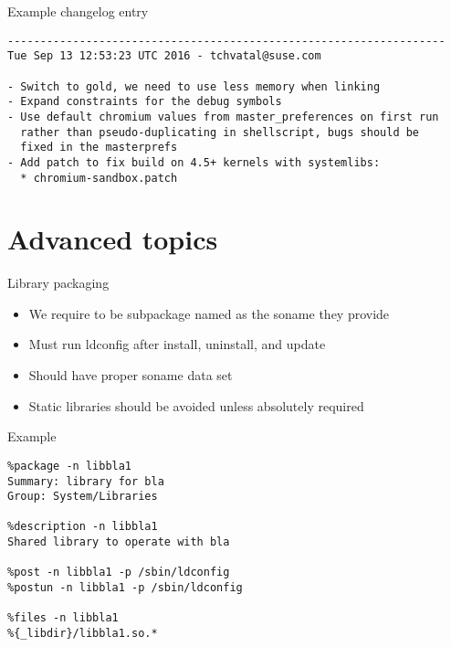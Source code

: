 \documentclass{beamer}
\begin{document}
\begin{frame}[fragile]{Example changelog entry}
	\begin{tiny}
	\begin{verbatim}
-------------------------------------------------------------------
Tue Sep 13 12:53:23 UTC 2016 - tchvatal@suse.com

- Switch to gold, we need to use less memory when linking
- Expand constraints for the debug symbols
- Use default chromium values from master_preferences on first run
  rather than pseudo-duplicating in shellscript, bugs should be
  fixed in the masterprefs
- Add patch to fix build on 4.5+ kernels with systemlibs:
  * chromium-sandbox.patch

	\end{verbatim}
	\end{tiny}
\end{frame}


\section{Advanced topics}

\begin{frame}[t]{Library packaging}
	\begin{itemize}
	\item We require to be subpackage named as the soname they provide
    \item Must run ldconfig after install, uninstall, and update
    \item Should have proper soname data set
    \item Static libraries should be avoided unless absolutely required
	\end{itemize}
\end{frame}

\begin{frame}[fragile]{Example}
	\begin{small}
	\begin{verbatim}
%package -n libbla1
Summary: library for bla
Group: System/Libraries

%description -n libbla1
Shared library to operate with bla

%post -n libbla1 -p /sbin/ldconfig
%postun -n libbla1 -p /sbin/ldconfig

%files -n libbla1
%{_libdir}/libbla1.so.*
	\end{verbatim}
	\end{small}
\end{frame}
\end{document}
